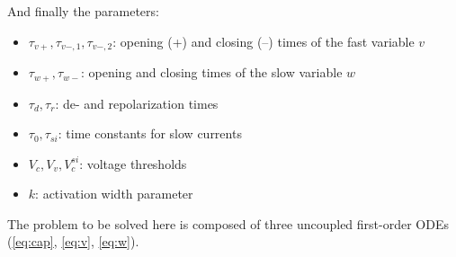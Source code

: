 And finally the parameters:
\begin{itemize}
    \item $\tau_{v+}, \tau_{v-,1}, \tau_{v-,2}$: opening (+) and closing (--)
        times of the fast variable $v$
    \item $\tau_{w+}, \tau_{w-}$: opening and closing times of the slow
        variable $w$
    \item $\tau_d, \tau_r$: de- and repolarization times
    \item $\tau_0, \tau_{si}$: time constants for slow currents
    \item $V_c, V_v, V_{c}^{si}$: voltage thresholds
    \item $k$: activation width parameter
\end{itemize}

The problem to be solved here is composed of three uncoupled first-order
ODEs (\ref{eq:cap}, \ref{eq:v}, \ref{eq:w}).


